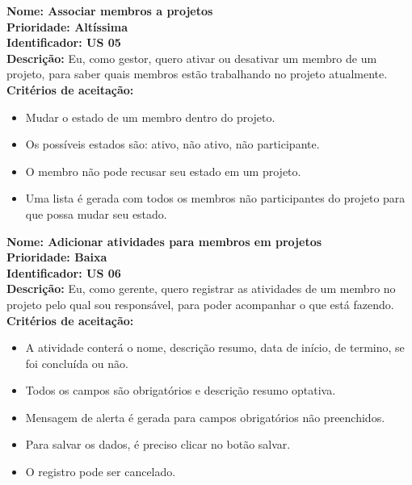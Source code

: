 \begin{anexosenv}
\indent \textbf{Nome: Associar membros a projetos\\
\indent Prioridade: Altíssima\\
\indent Identificador: US 05\\
\indent Descrição:} Eu, como gestor, quero ativar ou desativar um membro de um projeto, para saber quais membros estão trabalhando no projeto atualmente.\\
\indent \textbf{Critérios de aceitação:}
\begin{itemize}
    \item Mudar o estado de um membro dentro do projeto.
    \item Os possíveis estados são: ativo, não ativo, não participante.
    \item O membro não pode recusar seu estado em um projeto.
    \item Uma lista é gerada com todos os membros não participantes do projeto para que possa mudar seu estado.
\end{itemize}


\indent \textbf{Nome: Adicionar atividades para membros em projetos\\
\indent Prioridade: Baixa\\
\indent Identificador: US 06\\
\indent Descrição:} Eu, como gerente, quero registrar as atividades de um membro no projeto pelo qual sou responsável, para poder acompanhar o que está fazendo.\\
\indent \textbf{Critérios de aceitação:}
\begin{itemize}
    \item A atividade conterá o nome, descrição resumo, data de início, de termino, se foi concluída ou não.
    \item Todos os campos são obrigatórios e descrição resumo optativa.
    \item Mensagem de alerta é gerada para campos obrigatórios não preenchidos.
    \item Para salvar os dados, é preciso clicar no botão salvar.
    \item O registro pode ser cancelado.
\end{itemize}


\end{anexosenv}
